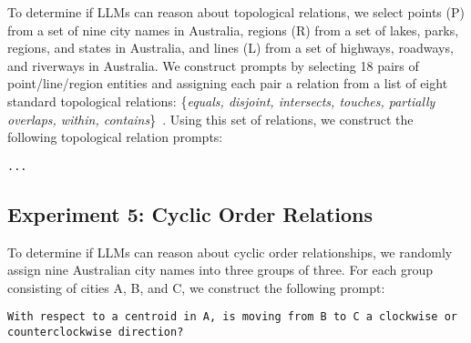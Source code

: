 
To determine if LLMs can reason about topological relations, we select points (P) from a set of nine city names in Australia, regions (R) from a set of lakes, parks, regions, and states in Australia, and lines (L) from a set of highways, roadways, and riverways in Australia.
We construct prompts by selecting 18 pairs of point/line/region entities and assigning each pair a relation from a list of eight standard topological relations: \{\textit{equals, disjoint, intersects, touches, partially overlaps, within, contains}\}~\cite{Carniel2023}.
Using this set of relations, we construct the following topological relation prompts:

\begin{lstlisting}[title=Topological Relation Prompt]
    ...
\end{lstlisting}





\subsection{Experiment 5: Cyclic Order Relations}


To determine if LLMs can reason about cyclic order relationships, we randomly assign nine Australian city names into three groups of three.
For each group consisting of cities A, B, and C, we construct the following prompt: 

\begin{lstlisting}[title=Cyclic Order Relation Prompt]
    With respect to a centroid in A, is moving from B to C a clockwise or counterclockwise direction?
\end{lstlisting}

